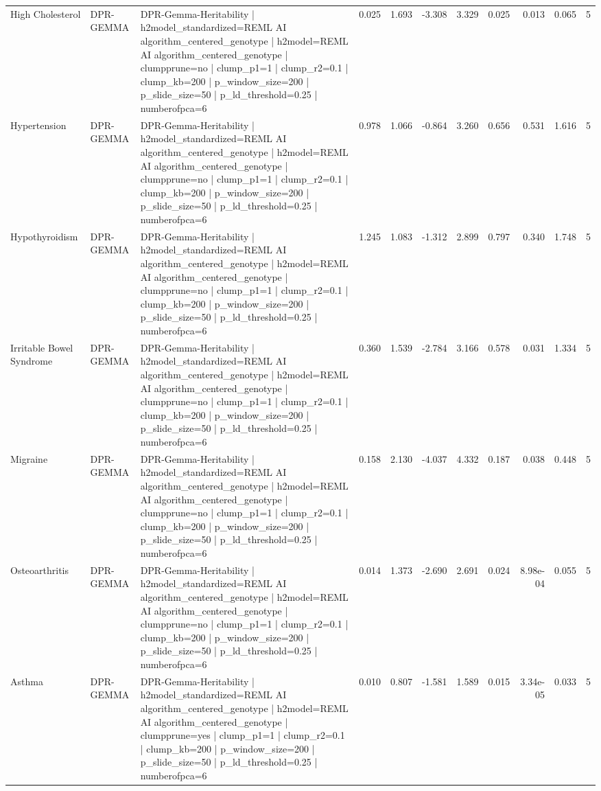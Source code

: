 \begin{landscape}
\begin{longtable}{p{2.4cm}p{1.8cm}p{6.0cm}rrrrrrrr}
High Cholesterol & DPR-GEMMA & DPR-Gemma-Heritability | h2model\_standardized=REML AI algorithm\_centered\_genotype | h2model=REML AI algorithm\_centered\_genotype | clumpprune=no | clump\_p1=1 | clump\_r2=0.1 | clump\_kb=200 | p\_window\_size=200 | p\_slide\_size=50 | p\_ld\_threshold=0.25 | numberofpca=6 & 0.025 & 1.693 & -3.308 & 3.329 & 0.025 & 0.013 & 0.065 & 5 \\
Hypertension & DPR-GEMMA & DPR-Gemma-Heritability | h2model\_standardized=REML AI algorithm\_centered\_genotype | h2model=REML AI algorithm\_centered\_genotype | clumpprune=no | clump\_p1=1 | clump\_r2=0.1 | clump\_kb=200 | p\_window\_size=200 | p\_slide\_size=50 | p\_ld\_threshold=0.25 | numberofpca=6 & 0.978 & 1.066 & -0.864 & 3.260 & 0.656 & 0.531 & 1.616 & 5 \\
Hypothyroidism & DPR-GEMMA & DPR-Gemma-Heritability | h2model\_standardized=REML AI algorithm\_centered\_genotype | h2model=REML AI algorithm\_centered\_genotype | clumpprune=no | clump\_p1=1 | clump\_r2=0.1 | clump\_kb=200 | p\_window\_size=200 | p\_slide\_size=50 | p\_ld\_threshold=0.25 | numberofpca=6 & 1.245 & 1.083 & -1.312 & 2.899 & 0.797 & 0.340 & 1.748 & 5 \\
Irritable Bowel Syndrome & DPR-GEMMA & DPR-Gemma-Heritability | h2model\_standardized=REML AI algorithm\_centered\_genotype | h2model=REML AI algorithm\_centered\_genotype | clumpprune=no | clump\_p1=1 | clump\_r2=0.1 | clump\_kb=200 | p\_window\_size=200 | p\_slide\_size=50 | p\_ld\_threshold=0.25 | numberofpca=6 & 0.360 & 1.539 & -2.784 & 3.166 & 0.578 & 0.031 & 1.334 & 5 \\
Migraine & DPR-GEMMA & DPR-Gemma-Heritability | h2model\_standardized=REML AI algorithm\_centered\_genotype | h2model=REML AI algorithm\_centered\_genotype | clumpprune=no | clump\_p1=1 | clump\_r2=0.1 | clump\_kb=200 | p\_window\_size=200 | p\_slide\_size=50 | p\_ld\_threshold=0.25 | numberofpca=6 & 0.158 & 2.130 & -4.037 & 4.332 & 0.187 & 0.038 & 0.448 & 5 \\
Osteoarthritis & DPR-GEMMA & DPR-Gemma-Heritability | h2model\_standardized=REML AI algorithm\_centered\_genotype | h2model=REML AI algorithm\_centered\_genotype | clumpprune=no | clump\_p1=1 | clump\_r2=0.1 | clump\_kb=200 | p\_window\_size=200 | p\_slide\_size=50 | p\_ld\_threshold=0.25 | numberofpca=6 & 0.014 & 1.373 & -2.690 & 2.691 & 0.024 & 8.98e-04 & 0.055 & 5 \\
Asthma & DPR-GEMMA & DPR-Gemma-Heritability | h2model\_standardized=REML AI algorithm\_centered\_genotype | h2model=REML AI algorithm\_centered\_genotype | clumpprune=yes | clump\_p1=1 | clump\_r2=0.1 | clump\_kb=200 | p\_window\_size=200 | p\_slide\_size=50 | p\_ld\_threshold=0.25 | numberofpca=6 & 0.010 & 0.807 & -1.581 & 1.589 & 0.015 & 3.34e-05 & 0.033 & 5 \\

\end{longtable}
\end{landscape}
